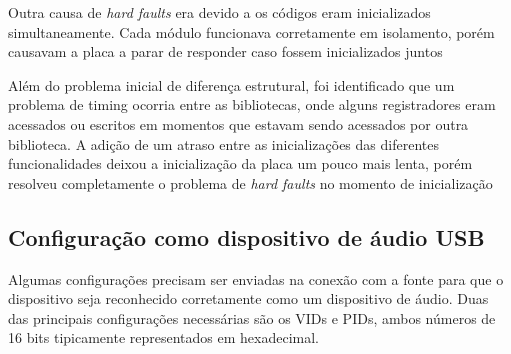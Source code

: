 


Outra causa de \textit{hard faults} era devido a os códigos eram inicializados simultaneamente. Cada módulo funcionava corretamente em isolamento, porém causavam a placa a parar de responder caso fossem inicializados juntos

Além do problema inicial de diferença estrutural, foi identificado que um problema de timing ocorria entre as bibliotecas, onde alguns registradores eram acessados ou escritos em momentos que estavam sendo acessados por outra biblioteca. A adição de um atraso entre as inicializações das diferentes funcionalidades deixou a inicialização da placa um pouco mais lenta, porém resolveu completamente o problema de \textit{hard faults} no momento de inicialização
\color{black}





\subsection{Configuração como dispositivo de áudio USB}
Algumas configurações precisam ser enviadas na conexão com a fonte para que o dispositivo seja reconhecido corretamente como um dispositivo de áudio. Duas das principais configurações necessárias são os VIDs e PIDs, ambos números de 16 bits tipicamente representados em hexadecimal.

